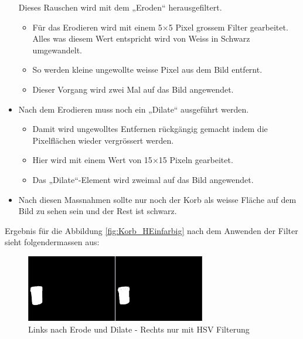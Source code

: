 \begin{itemize}
        Dieses Rauschen wird mit dem „Eroden“ herausgefiltert.
    \begin{itemize}
        \item Für das Erodieren wird mit einem 5$\times$5 Pixel grossem Filter gearbeitet. 
            Alles was diesem Wert entspricht wird von Weiss in Schwarz 
            umgewandelt.
        \item So werden kleine ungewollte weisse Pixel aus dem Bild entfernt.
        \item Dieser Vorgang wird zwei Mal auf das Bild angewendet.
    \end{itemize}
    \item Nach dem Erodieren muss noch ein „Dilate“ ausgeführt werden.
    \begin{itemize}
        \item Damit wird ungewolltes Entfernen rückgängig gemacht 
            indem die Pixelflächen wieder vergrössert werden.
        \item Hier wird mit einem Wert von 15$\times$15 Pixeln gearbeitet.
        \item Das „Dilate“-Element wird zweimal auf das Bild angewendet.
    \end{itemize}
    \item Nach diesen Massnahmen sollte nur noch der Korb als weisse Fläche 
        auf dem Bild zu sehen sein und der Rest ist schwarz.
\end{itemize}

Ergebnis für die Abbildung \ref{fig:Korb_HEinfarbig} nach dem Anwenden der 
Filter sieht folgendermassen aus:

\begin{figure}[h!]
    \centering
    \includegraphics[width=0.7\textwidth]{fig/Korberkennung1.png}
    \caption{Links nach Erode und Dilate - Rechts nur mit HSV Filterung}
    \label{fig:Korb_Erkennung}
\end{figure}

